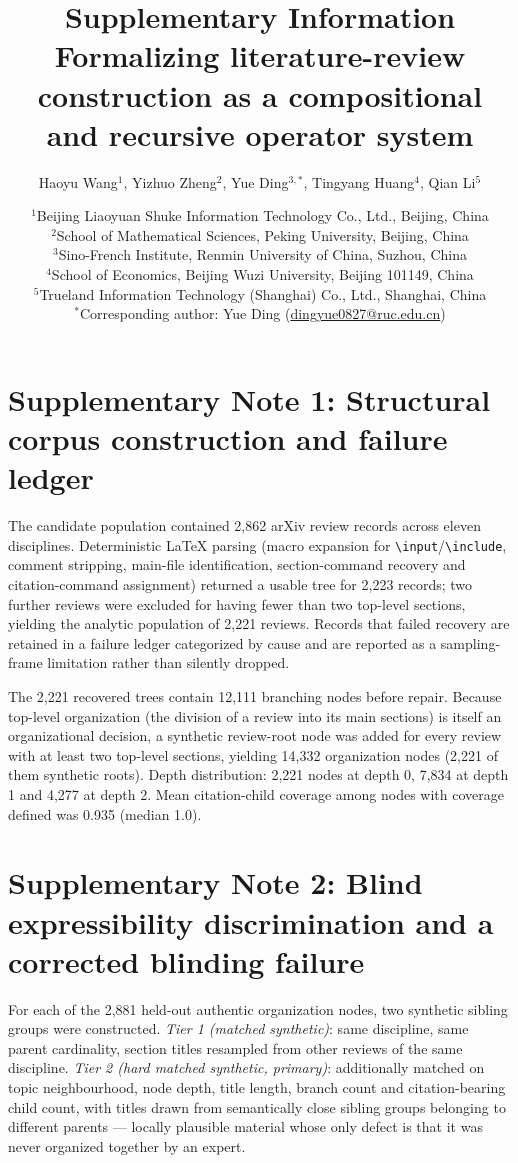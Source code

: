 \documentclass[11pt,a4paper]{article}
\title{Supplementary Information\\[4pt]\large Formalizing literature-review construction as a compositional and recursive operator system}
\author{%
Haoyu Wang$^{1}$,
Yizhuo Zheng$^{2}$,
Yue Ding$^{3,\ast}$,
Tingyang Huang$^{4}$,
Qian Li$^{5}$
}
\date{%
\normalsize
$^{1}$Beijing Liaoyuan Shuke Information Technology Co., Ltd., Beijing, China\\
$^{2}$School of Mathematical Sciences, Peking University, Beijing, China\\
$^{3}$Sino-French Institute, Renmin University of China, Suzhou, China\\
$^{4}$School of Economics, Beijing Wuzi University, Beijing 101149, China\\
$^{5}$Trueland Information Technology (Shanghai) Co., Ltd., Shanghai, China\\[6pt]
$^{\ast}$Corresponding author: Yue Ding (\href{mailto:dingyue0827@ruc.edu.cn}{dingyue0827@ruc.edu.cn})
}
\newcommand{\snote}[1]{\section*{Supplementary Note #1}}
\begin{document}
\maketitle

\tableofcontents

\clearpage

\snote{1: Structural corpus construction and failure ledger}

The candidate population contained 2,862 arXiv review records across eleven disciplines. Deterministic LaTeX parsing (macro expansion for \texttt{\textbackslash input}/\texttt{\textbackslash include}, comment stripping, main-file identification, section-command recovery and citation-command assignment) returned a usable tree for 2,223 records; two further reviews were excluded for having fewer than two top-level sections, yielding the analytic population of 2,221 reviews. Records that failed recovery are retained in a failure ledger categorized by cause and are reported as a sampling-frame limitation rather than silently dropped.

The 2,221 recovered trees contain 12,111 branching nodes before repair. Because top-level organization (the division of a review into its main sections) is itself an organizational decision, a synthetic review-root node was added for every review with at least two top-level sections, yielding 14,332 organization nodes (2,221 of them synthetic roots). Depth distribution: 2,221 nodes at depth 0, 7,834 at depth 1 and 4,277 at depth 2. Mean citation-child coverage among nodes with coverage defined was 0.935 (median 1.0).

\snote{2: Blind expressibility discrimination and a corrected blinding failure}

For each of the 2,881 held-out authentic organization nodes, two synthetic sibling groups were constructed. \emph{Tier 1 (matched synthetic)}: same discipline, same parent cardinality, section titles resampled from other reviews of the same discipline. \emph{Tier 2 (hard matched synthetic, primary)}: additionally matched on topic neighbourhood, node depth, title length, branch count and citation-bearing child count, with titles drawn from semantically close sibling groups belonging to different parents --- locally plausible material whose only defect is that it was never organized together by an expert.
\end{document}
